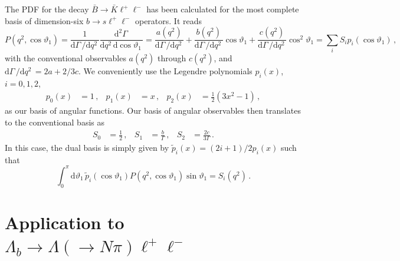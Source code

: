 \documentclass[aps,prd,reprint,nofootinbib,preprintnumbers]{revtex4}
\newcommand{\dual}[1]{\tilde{#1}}
\newcommand{\rmdx}[1]{\mbox{d} #1 \,} %
\renewcommand{\theta}{\vartheta}
\begin{document}
The PDF for the decay $\bar{B}\to\bar{K}\ell^+\ell^-$ has been calculated for the most
complete basis of dimension-six $b\to s \ell^+\ell^-$ operators. It reads \cite{Bobeth:2007dw,Bobeth:2012vn}
\begin{equation}
    P(q^2, \cos\theta_1)
        = \frac{1}{\rmdx{\Gamma}/\rmdx{q^2}} \frac{\rmdx{^2\Gamma}}{\rmdx{q^2} \rmdx{\cos\theta_1}}
        = \frac{a(q^2)}{\rmdx{\Gamma}/\rmdx{q^2}} + \frac{b(q^2)}{\rmdx{\Gamma}/\rmdx{q^2}} \cos\theta_1 + \frac{c(q^2)}{\rmdx{\Gamma}/\rmdx{q^2}} \cos^2\theta_1
        = \sum_i S_i p_i(\cos\theta_1)\,,
\end{equation}
with the conventional observables $a(q^2)$ through $c(q^2)$, and $\rmdx{\Gamma}/\rmdx{q^2} = 2a + 2/3 c$. We conveniently use the Legendre polynomials
$p_i(x)$, $i=0,1,2$,
\begin{equation}
\begin{aligned}
    p_0(x) & = 1\,, &
    p_1(x) & = x\,, &
    p_2(x) & = \frac{1}{2} (3x^2 - 1)\,,
\end{aligned}
\end{equation}
as our basis of angular functions. Our basis of angular observables then
translates to the conventional basis as
\begin{equation}
\begin{aligned}
    S_0 & = \frac{1}{2}\,, &
    S_1 & = \frac{b}{\Gamma}\,, &
    S_2 & = \frac{2c}{3\Gamma}\,.
\end{aligned}
\end{equation}
In this case, the dual basis is simply given by $\tilde{p}_i(x) = (2 i + 1)/2 p_i(x)$
such that
\begin{equation}
    \int_0^\pi \rmdx{\theta_1} \dual{p}_i(\cos\theta_1) P(q^2, \cos\theta_1)\sin\theta_1 = S_i(q^2)\,.
\end{equation}

\section{Application to $\Lambda_b\to \Lambda(\to N \pi)\ell^+\ell^-$}
\label{app:lambdabtolambdall}
\end{document}
